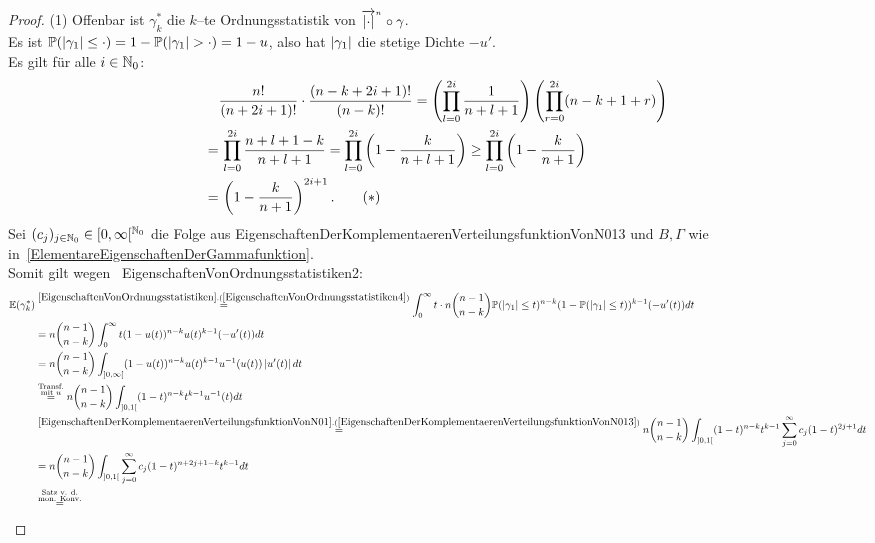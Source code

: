 \begin{proof}
(1) Offenbar ist 
$\gamma_k^\ast$ die $k$--te Ordnungsstatistik von 
${\overrightarrow{\left|\cdot\right|}}^{{}_n} \circ \gamma$.\\
Es ist $\mathbb{P}(\left|\gamma_1\right| \le \cdot) = 1 - \mathbb{P}(\left|\gamma_1\right| > \cdot)
= 1 - u$, also hat $\left|\gamma_1\right|$ die stetige Dichte $-u'$.\\
Es gilt für alle $i \in \mathbb{N}_0$:
\begin{align*}
&\frac{n!}{(n+2i+1)!}\cdot\frac{(n-k+2i+1)!}{(n-k)!}
= \left(\prod_{l=0}^{2i}\frac{1}{n+l+1} \right)
\left(\prod_{r=0}^{2i}(n-k+1+r) \right)\\
=&\, \prod_{l=0}^{2i}\frac{n+l+1-k}{n+l+1}
=\prod_{l=0}^{2i}\left(1- \frac{k}{n+l+1} \right)
\ge \prod_{l=0}^{2i}\left(1- \frac{k}{n+1} \right)\\
=&\, \left(1- \frac{k}{n+1} \right)^{2i+1}\text.\tag {$\ast$}
\end{align*}
Sei $(c_j)_{j\in \mathbb{N}_0} \in [0, \infty[^{\mathbb{N}_0}$ die Folge aus
         {EigenschaftenDerKomplementaerenVerteilungsfunktionVonN013} und
$B, \Gamma$ wie in~\ref{ElementareEigenschaftenDerGammafunktion}.\\
Somit gilt wegen~
{EigenschaftenVonOrdnungsstatistiken2}:
\begin{align*}
\E(\gamma_k^\ast) &\overset{
\refclaim{EigenschaftenVonOrdnungsstatistiken}
{EigenschaftenVonOrdnungsstatistiken4}}= 
\int_0^\infty t \cdot n \binom{n-1}{n-k}\Prim(\abs{\gamma_1}\le t)^{n-k}
(1 - \Prim(\abs{\gamma_1} \le t))^{k-1}(-u'(t))dt\\
&= n \binom{n-1}{n-k} \int_0^\infty t (1-u(t))^{n-k}u(t)^{k-1}(-u'(t))dt\\
&= n \binom{n-1}{n-k} 
\int_{]0, \infty[} (1-u(t))^{n-k}u(t)^{k-1}u\inv(u(t)) \abs{u'(t)}dt\\
&\overset{\substack{\text{Transf.}\\ \text{mit }u}}=
n \binom{n-1}{n-k} \int_{]0,1[}(1-t)^{n-k}t^{k-1}u\inv(t)dt\\
&\overset{\refclaim{EigenschaftenDerKomplementaerenVerteilungsfunktionVonN01}
         {EigenschaftenDerKomplementaerenVerteilungsfunktionVonN013}}=
n \binom{n-1}{n-k} \int_{]0, 1[} (1-t)^{n-k}t^{k-1}\sum_{j=0}^\infty 
c_j(1-t)^{2j+1} dt\\
&=n \binom{n-1}{n-k}\int_{]0,1[} 
\sum_{j=0}^\infty c_j (1-t)^{n+2j+1-k}t^{k-1}dt\\
&\overset{\substack{\text{Satz v. d.}\\\text{mon. Konv.}}}= 

\end{align*}
\end{proof}
